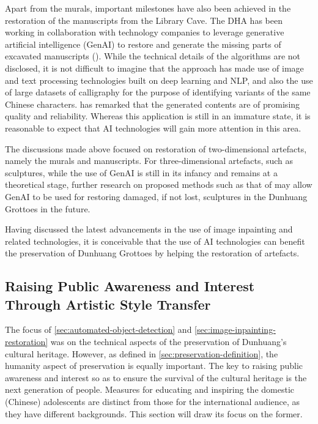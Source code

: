 Apart from the murals, important milestones have also been achieved in the restoration of the manuscripts from
the Library Cave. The DHA has been working in collaboration with technology companies to leverage generative
artificial intelligence (GenAI) to restore and generate the missing parts of excavated manuscripts
(). While the technical details of the algorithms are not
disclosed, it is not difficult to imagine that the approach has made use of image and text processing technologies
built on deep learning and NLP, and also the use of large datasets of calligraphy for the purpose of identifying
variants of the same Chinese characters.  has remarked that
the generated contents are of promising quality and reliability. Whereas this application is still in an immature
state, it is reasonable to expect that AI technologies will gain more attention in this area.

The discussions made above focused on restoration of two-dimensional artefacts, namely the murals and manuscripts.
For three-dimensional artefacts, such as sculptures, while the use of GenAI is still in its infancy and remains
at a theoretical stage, further research on proposed methods such as that of
 may allow GenAI to be used for restoring damaged, if not
lost, sculptures in the Dunhuang Grottoes in the future.

Having discussed the latest advancements in the use of image inpainting and related technologies, it is conceivable
that the use of AI technologies can benefit the preservation of Dunhuang Grottoes by helping the restoration of
artefacts.

\subsection{Raising Public Awareness and Interest Through Artistic Style Transfer}

The focus of \cref{sec:automated-object-detection} and \cref{sec:image-inpainting-restoration} was on the
technical aspects of the preservation of Dunhuang's cultural heritage. However, as defined in
\cref{sec:preservation-definition}, the humanity aspect of preservation is equally important.
The key to raising public awareness and interest so as to ensure the survival of the cultural heritage
is the next generation of people. Measures for educating and inspiring the domestic (Chinese) adolescents
are distinct from those for the international audience, as they have different backgrounds. This section will
draw its focus on the former.

